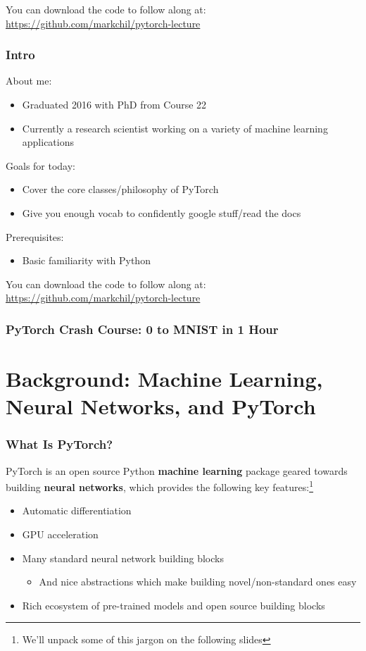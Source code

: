 \documentclass[xcolor={x11names,table}]{beamer}
\title{\stabletitle}
\author[markchil] 
{Mark Chilenski\\(markchil)}
\newcommand{\stabletitle}{PyTorch Crash Course: 0 to MNIST in 1 Hour}
\begin{document}
\begin{frame}
 	\titlepage
	
	\begin{center}
		\item You can download the code to follow along at: \url{https://github.com/markchil/pytorch-lecture}
	\end{center}
\end{frame}

\begin{frame}
	\frametitle{Intro}
	About me:
	\begin{itemize}
		\item Graduated 2016 with PhD from Course 22
		\item Currently a research scientist working on a variety of machine learning applications
	\end{itemize}
	Goals for today:
	\begin{itemize}
		\item Cover the core classes/philosophy of PyTorch
		\item Give you enough vocab to confidently google stuff/read the docs
	\end{itemize}
	Prerequisites:
	\begin{itemize}
		\item Basic familiarity with Python
	\end{itemize}
	You can download the code to follow along at: \url{https://github.com/markchil/pytorch-lecture}
\end{frame}

\begin{frame}
	\frametitle{\stabletitle}
	\tableofcontents
\end{frame}

\section{Background: Machine Learning, Neural Networks, and PyTorch}

\begin{frame}
	\frametitle{What Is PyTorch?}
	PyTorch is an open source Python \textbf{machine learning} package geared towards building \textbf{neural networks}, which provides the following key features:\footnote{We'll unpack some of this jargon on the following slides}
	\begin{itemize}
		\item Automatic differentiation
		\item GPU acceleration
		\item Many standard neural network building blocks
		\begin{itemize}
			\item And nice abstractions which make building novel/non-standard ones easy
		\end{itemize}
		\item Rich ecosystem of pre-trained models and open source building blocks
	\end{itemize}
\end{frame}
\end{document}
